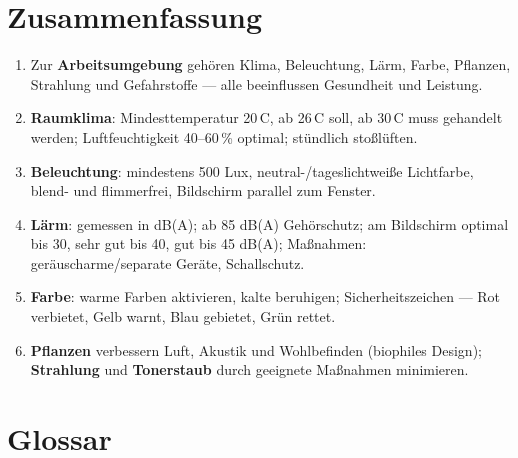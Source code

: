 \documentclass[11pt, a4paper]{article}
\begin{document}
\section{Zusammenfassung}

\begin{enumerate}
  \item Zur \textbf{Arbeitsumgebung} gehören Klima, Beleuchtung, Lärm, Farbe, Pflanzen, Strahlung und Gefahrstoffe --- alle beeinflussen Gesundheit und Leistung.
  \item \textbf{Raumklima}: Mindesttemperatur 20\,\textdegree C, ab 26\,\textdegree C soll, ab 30\,\textdegree C muss gehandelt werden; Luftfeuchtigkeit 40--60\,\% optimal; stündlich stoßlüften.
  \item \textbf{Beleuchtung}: mindestens 500 Lux, neutral-/tageslichtweiße Lichtfarbe, blend- und flimmerfrei, Bildschirm parallel zum Fenster.
  \item \textbf{Lärm}: gemessen in dB(A); ab 85 dB(A) Gehörschutz; am Bildschirm optimal bis 30, sehr gut bis 40, gut bis 45 dB(A); Maßnahmen: geräuscharme/separate Geräte, Schallschutz.
  \item \textbf{Farbe}: warme Farben aktivieren, kalte beruhigen; Sicherheitszeichen --- Rot verbietet, Gelb warnt, Blau gebietet, Grün rettet.
  \item \textbf{Pflanzen} verbessern Luft, Akustik und Wohlbefinden (biophiles Design); \textbf{Strahlung} und \textbf{Tonerstaub} durch geeignete Maßnahmen minimieren.
\end{enumerate}

\newpage

\section*{Glossar}




\end{document}
